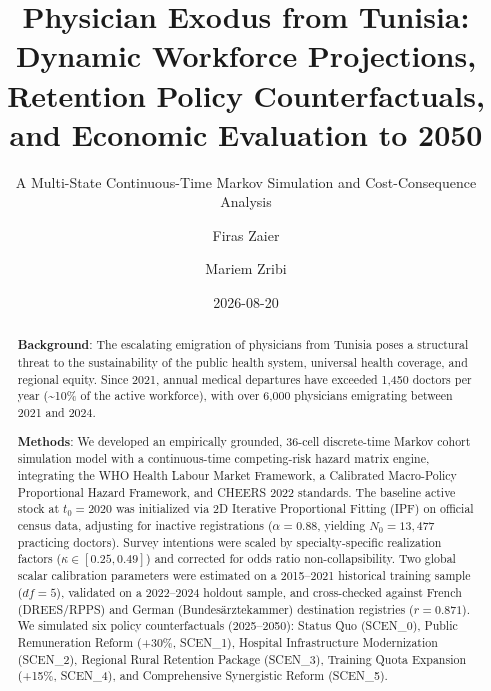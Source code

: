 \documentclass[
  11pt,
  a4paper]{article}
\title{Physician Exodus from Tunisia: Dynamic Workforce Projections,
Retention Policy Counterfactuals, and Economic Evaluation to 2050}
\subtitle{A Multi-State Continuous-Time Markov Simulation and
Cost-Consequence Analysis}
\author{Firas Zaier \and Mariem Zribi}
\date{2026-08-20}
\begin{document}
\maketitle
\begin{abstract}
\textbf{Background}: The escalating emigration of physicians from
Tunisia poses a structural threat to the sustainability of the public
health system, universal health coverage, and regional equity. Since
2021, annual medical departures have exceeded 1,450 doctors per year
(\textasciitilde10\% of the active workforce), with over 6,000
physicians emigrating between 2021 and 2024.

\textbf{Methods}: We developed an empirically grounded, 36-cell
discrete-time Markov cohort simulation model with a continuous-time
competing-risk hazard matrix engine, integrating the WHO Health Labour
Market Framework, a Calibrated Macro-Policy Proportional Hazard
Framework, and CHEERS 2022 standards. The baseline active stock at
\(t_0 = 2020\) was initialized via 2D Iterative Proportional Fitting
(IPF) on official census data, adjusting for inactive registrations
(\(\alpha = 0.88\), yielding \(N_0 = 13,477\) practicing doctors).
Survey intentions were scaled by specialty-specific realization factors
(\(\kappa \in [0.25, 0.49]\)) and corrected for odds ratio
non-collapsibility. Two global scalar calibration parameters were
estimated on a 2015--2021 historical training sample (\(df = 5\)),
validated on a 2022--2024 holdout sample, and cross-checked against
French (DREES/RPPS) and German (Bundesärztekammer) destination
registries (\(r = 0.871\)). We simulated six policy counterfactuals
(2025--2050): Status Quo (SCEN\_0), Public Remuneration Reform (+30\%,
SCEN\_1), Hospital Infrastructure Modernization (SCEN\_2), Regional
Rural Retention Package (SCEN\_3), Training Quota Expansion (+15\%,
SCEN\_4), and Comprehensive Synergistic Reform (SCEN\_5).


\end{abstract}
\end{document}
